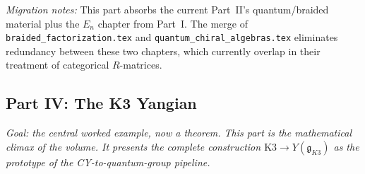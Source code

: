 \documentclass[11pt]{article}
\begin{document}
\textit{Migration notes:} This part absorbs the current Part~II's
quantum/braided material plus the $E_n$ chapter from Part~I. The
merge of \texttt{braided\_factorization.tex} and
\texttt{quantum\_chiral\_algebras.tex} eliminates redundancy between
these two chapters, which currently overlap in their treatment of
categorical $R$-matrices.

\subsection{Part IV: The K3 Yangian}
\label{sec:part-iv}

\textit{Goal: the central worked example, now a theorem. This part is
the mathematical climax of the volume. It presents the complete
construction $\mathrm{K3}\to Y(\mathfrak{g}_{K3})$ as the prototype
of the CY-to-quantum-group pipeline.}
\end{document}
